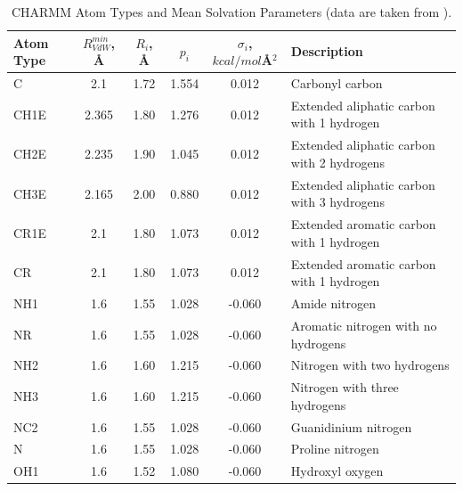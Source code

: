 \documentclass[11pt]{book}
\begin{document}
\begin{table}[t]
{\caption{CHARMM Atom Types and Mean Solvation Parameters (data are taken from \cite{FerraraProteins02}).\label{tab:sasa-parameters}}}
\footnotesize
\begin{tabular*}{\textwidth}{@{\extracolsep{\fill}}| l | c | c | c | c | l |}\hline
Atom Type & $R_{VdW}^{min}$, \AA & $R_{i}$, \AA & $p_{i}$      & $\sigma_{i}$, $kcal/mol$\AA$^2$ & Description \\ \hline
C         & 2.1                  & 1.72         & 1.554        &  0.012                        & Carbonyl carbon \\
CH1E      & 2.365                & 1.80         & 1.276        &  0.012                        & Extended aliphatic carbon with 1 hydrogen \\
CH2E      & 2.235                & 1.90         & 1.045        &  0.012                        & Extended aliphatic carbon with 2 hydrogens \\
CH3E      & 2.165                & 2.00         & 0.880        &  0.012                        & Extended aliphatic carbon with 3 hydrogens \\
CR1E      & 2.1                  & 1.80         & 1.073        &  0.012                        & Extended aromatic carbon with 1 hydrogen \\
CR        & 2.1                  & 1.80         & 1.073        &  0.012                        & Extended aromatic carbon with 1 hydrogen \\
NH1       & 1.6                  & 1.55         & 1.028        & -0.060                        & Amide nitrogen \\
NR        & 1.6                  & 1.55         & 1.028        & -0.060                        & Aromatic nitrogen with no hydrogens \\
NH2       & 1.6                  & 1.60         & 1.215        & -0.060                        & Nitrogen with two hydrogens \\
NH3       & 1.6                  & 1.60         & 1.215        & -0.060                        & Nitrogen with three hydrogens \\
NC2       & 1.6                  & 1.55         & 1.028        & -0.060                        & Guanidinium nitrogen \\
N         & 1.6                  & 1.55         & 1.028        & -0.060                        & Proline nitrogen \\
OH1       & 1.6                  & 1.52         & 1.080        & -0.060                        & Hydroxyl oxygen \\

\end{tabular*}
\end{table}
\end{document}
